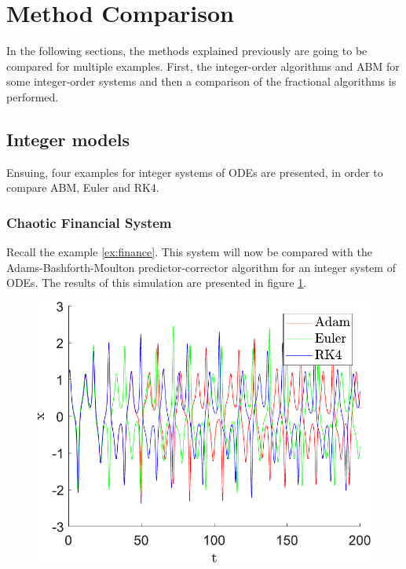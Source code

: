 \section{Method Comparison}
In the following sections, the methods explained previously are going to be compared for multiple examples. First, the integer-order algorithms and ABM for some integer-order systems and then a comparison of the fractional algorithms is performed. 

\subsection{Integer models}
Ensuing, four examples for integer systems of ODEs are presented, in order to compare ABM, Euler and RK4.
\subsubsection{Chaotic Financial System}
Recall the example \ref{ex:finance}. This system will now be compared with the Adams-Bashforth-Moulton predictor-corrector algorithm for an integer system of ODEs. The results of this simulation are presented in figure \ref{fig:comparFinanceX}.

\begin{figure}[H]
    \centering
    \includegraphics[scale=0.5]{files/adm_euler_rk4_x.pdf}
    \caption{}
    \label{fig:comparFinanceX}
\end{figure}




